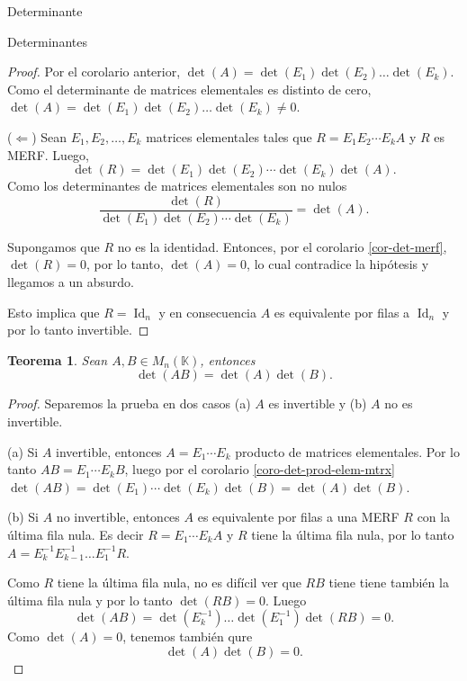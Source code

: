 \documentclass[a4paper,12pt,twoside,spanish,reqno]{amsbook}
\numberwithin{equation}{section}
\newtheorem{teorema}{Teorema}[section]
\theoremstyle{definition}
\theoremstyle{remark}
\newcommand{\Id}{\operatorname{Id}}
\newcommand{\K}{\mathbb K}
\begin{document}
\begin{chapter}{Determinante}
\begin{section}{Determinantes}
\begin{proof}
            Por el corolario anterior,  $\det(A) = \det(E_1) \det(E_2) \ldots \det(E_k)$. Como el determinante de matrices elementales es distinto de cero, $\det(A) = \det(E_1) \det(E_2) \ldots \det(E_k)\ne 0$.
    
            ($\Leftarrow$) Sean $E_1, E_2, \ldots, E_k$ matrices elementales tales que $R = E_1 E_2 \cdots E_k A$ y $R$ es MERF. Luego,
            \begin{equation*}
                \det(R) = \det(E_1) \det(E_2) \cdots \det(E_k) \det(A). 
            \end{equation*}
            Como los determinantes de matrices  elementales son no nulos
    \begin{equation*}
        \frac{\det(R)}{\det(E_1) \det(E_2) \cdots \det(E_k) } = \det(A). \tag{*}
    \end{equation*}

    
    Supongamos que $R$ no es la identidad.  Entonces, por el corolario \ref{cor-det-merf}, $\det(R) =0$,  por lo tanto, $\det(A)=0$, lo cual contradice la hipótesis y llegamos a un absurdo. 

    Esto implica que  $R= \Id_n$ y en consecuencia  $A$ es equivalente por filas a $\Id_n$ y por lo tanto  invertible.
        \end{proof}
         
    
         \begin{teorema}\label{th-dem-detAB}  Sean $A,B \in M_n(\K)$,  entonces
        $$\det (A B) = \det(A)\det(B).$$
         \end{teorema}
         \begin{proof} 	Separemos la prueba en dos casos (a) $A$ es invertible  y (b) $A$ no es invertible.

            (a) Si $A$ invertible, entonces $A= E_1\cdots E_k$ producto de matrices elementales. Por lo tanto  $AB =  E_1\cdots E_kB$, luego por el corolario \ref{coro-det-prod-elem-mtrx}  $\det(AB) =  \det(E_1)\cdots \det(E_k)\det(B) = \det(A)\det(B)$. 
            
            (b) Si $A$ no invertible,  entonces $A$  es equivalente por filas a una MERF $R$ con la última fila nula. Es decir $R =E_1\cdots E_kA$ y $R$ tiene la última fila nula, por  lo tanto $A=  E_k^{-1}E_{k-1}^{-1}\ldots E_1^{-1}R$. 
            
            Como $R$ tiene la última fila nula, no es difícil ver que  $RB$ tiene tiene también la última fila nula y por lo tanto $\det(RB)=0$. Luego 
             $$
             \det(AB) = \det( E_k^{-1}) \ldots \det(E_1^{-1})\det(RB) =0.
             $$
             Como  $\det(A)=0$, tenemos también qure 
             $$
             \det(A)\det(B) =0.
             $$  
         \end{proof}
         

\end{section}
\end{chapter}
\end{document}
